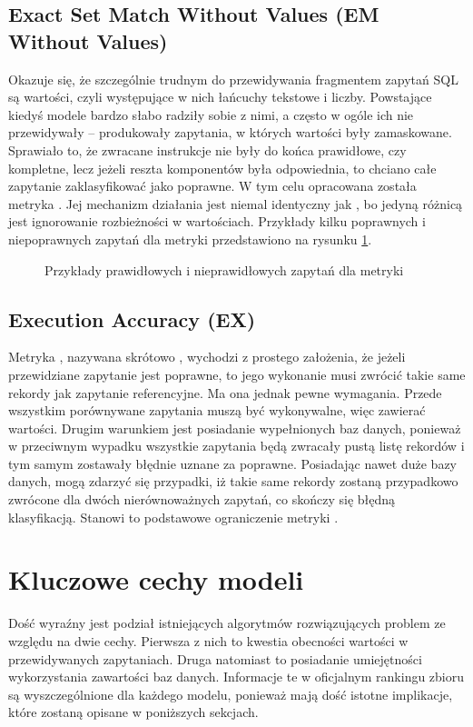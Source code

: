 \subsection{Exact Set Match Without Values (EM Without Values)}
Okazuje się, że szczególnie trudnym do przewidywania fragmentem zapytań SQL są wartości, czyli występujące w nich łańcuchy tekstowe i liczby. Powstające kiedyś modele bardzo słabo radziły sobie z nimi, a często w ogóle ich nie przewidywały -- produkowały zapytania, w których wartości były zamaskowane. Sprawiało to, że zwracane instrukcje nie były do końca prawidłowe, czy kompletne, lecz jeżeli reszta komponentów była odpowiednia, to chciano całe zapytanie zaklasyfikować jako poprawne. W tym celu opracowana została metryka . Jej mechanizm działania jest niemal identyczny jak , bo jedyną różnicą jest ignorowanie rozbieżności w wartościach. Przykłady kilku poprawnych i niepoprawnych zapytań dla metryki  przedstawiono na rysunku \ref{fig:em-without-values}.

\begin{figure}[ht!]
  \centering
  
  \caption{Przykłady prawidłowych i nieprawidłowych zapytań dla metryki }
  \label{fig:em-without-values}
\end{figure}

\subsection{Execution Accuracy (EX)}
\label{text:execution_accuracy}
Metryka , nazywana skrótowo , wychodzi z prostego założenia, że jeżeli przewidziane zapytanie jest poprawne, to jego wykonanie musi zwrócić takie same rekordy jak zapytanie referencyjne. Ma ona jednak pewne wymagania. Przede wszystkim porównywane zapytania muszą być wykonywalne, więc zawierać wartości. Drugim warunkiem jest posiadanie wypełnionych baz danych, ponieważ w przeciwnym wypadku wszystkie zapytania będą zwracały pustą listę rekordów i tym samym zostawały błędnie uznane za poprawne. Posiadając nawet duże bazy danych, mogą zdarzyć się przypadki, iż takie same rekordy zostaną przypadkowo zwrócone dla dwóch nierównoważnych zapytań, co skończy się błędną klasyfikacją. Stanowi to podstawowe ograniczenie metryki .

\section{Kluczowe cechy modeli}
Dość wyraźny jest podział istniejących algorytmów rozwiązujących problem  ze względu na dwie cechy. Pierwsza z nich to kwestia obecności wartości w przewidywanych zapytaniach. Druga natomiast to posiadanie umiejętności wykorzystania zawartości baz danych. Informacje te w oficjalnym rankingu zbioru  są wyszczególnione dla każdego modelu, ponieważ mają dość istotne implikacje, które zostaną opisane w poniższych sekcjach.

